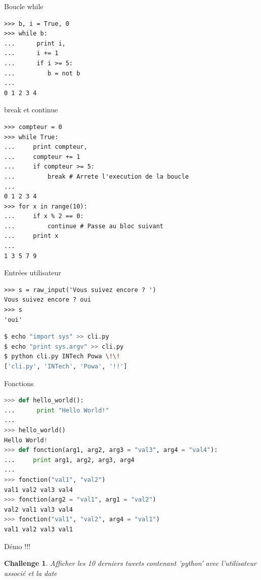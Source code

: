\documentclass{beamer}
\begin{document}
\begin{frame}[fragile]{Boucle while}
\begin{lstlisting}
>>> b, i = True, 0
>>> while b:
...      print i,
...      i += 1
...      if i >= 5:
...         b = not b
... 
0 1 2 3 4
\end{lstlisting}
\end{frame}

\begin{frame}[fragile]{break et continue}
\begin{lstlisting}
>>> compteur = 0
>>> while True:
...     print compteur,
...     compteur += 1
...     if compteur >= 5:
...         break # Arrete l'execution de la boucle
...
0 1 2 3 4
>>> for x in range(10):
...     if x % 2 == 0:
...         continue # Passe au bloc suivant
...     print x
...
1 3 5 7 9
\end{lstlisting}
\end{frame}

\begin{frame}[fragile]{Entrées utilisateur}
\begin{lstlisting}
>>> s = raw_input('Vous suivez encore ? ')
Vous suivez encore ? oui
>>> s
'oui'
\end{lstlisting}

\begin{lstlisting}[language=bash]
$ echo "import sys" >> cli.py
$ echo "print sys.argv" >> cli.py
$ python cli.py INTech Powa \!\!
['cli.py', 'INTech', 'Powa', '!!']
\end{lstlisting}
\end{frame}

\begin{frame}[fragile]{Fonctions}
\begin{lstlisting}[language=python]
>>> def hello_world():
...      print "Hello World!"
... 
>>> hello_world()
Hello World!
>>> def fonction(arg1, arg2, arg3 = "val3", arg4 = "val4"):
...     print arg1, arg2, arg3, arg4
... 
>>> fonction("val1", "val2")
val1 val2 val3 val4
>>> fonction(arg2 = "val1", arg1 = "val2")
val2 val1 val3 val4
>>> fonction("val1", "val2", arg4 = "val1")
val1 val2 val3 val1
\end{lstlisting}
\end{frame}

\newtheorem{challenge}{Challenge}
\begin{frame}[fragile]{Démo !!!}
\begin{challenge}
Afficher les 10 derniers tweets contenant 'python' avec l'utilisateur associé et la date
\end{challenge}
\end{frame}
\end{document}
